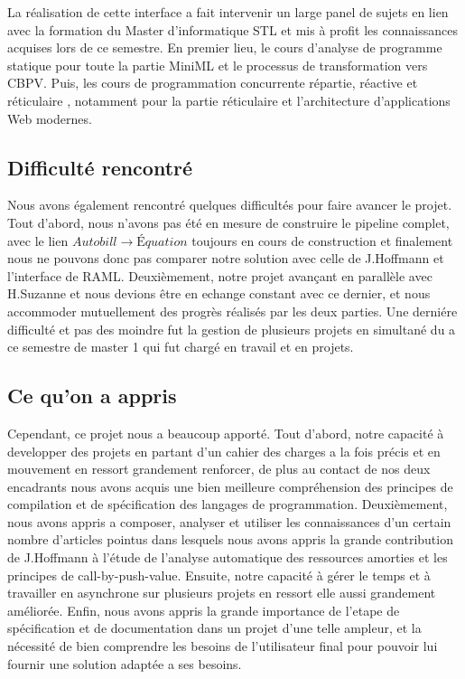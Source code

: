 \documentclass[12pt]{article}
\begin{document}
La réalisation de cette interface a fait intervenir un large panel de
sujets en lien avec la formation du Master d'informatique STL et mis à
profit les connaissances acquises lors de ce semestre. En premier lieu,
le cours d'analyse de programme statique
\cite{APS} pour toute la partie MiniML et le
processus de transformation vers CBPV. Puis, les cours de programmation
concurrente répartie, réactive et réticulaire
\cite{PC3R}, notamment pour la partie
réticulaire et l'architecture d'applications Web modernes.\\

\subsection{Difficulté rencontré}\label{Difficulté-rencontré}

Nous avons également rencontré quelques difficultés pour faire avancer le projet.
Tout d'abord, nous n'avons pas été en mesure de construire le pipeline complet, avec le lien $Autobill \rightarrow Équation$ toujours en cours de construction et finalement nous ne pouvons donc pas comparer notre solution avec celle de J.Hoffmann et l'interface de RAML.
Deuxièmement, notre projet avançant en parallèle avec H.Suzanne et nous devions être en echange constant avec ce dernier, et nous accommoder mutuellement des progrès réalisés par les deux parties.
Une derniére difficulté et pas des moindre fut la gestion de plusieurs projets en simultané du a ce semestre de master 1 qui fut chargé en travail et en projets.

\subsection{Ce qu'on a appris}\label{Ce qu'on a appris}
Cependant, ce projet nous a beaucoup apporté.
Tout d'abord, notre capacité à developper des projets en partant d'un cahier des charges a la fois précis et en mouvement en ressort grandement renforcer, de plus au contact de nos deux encadrants nous avons acquis une bien meilleure compréhension des principes de compilation et de spécification des langages de programmation.
Deuxièmement, nous avons appris a composer, analyser et utiliser les connaissances d'un certain nombre d'articles pointus  dans lesquels nous avons appris la grande contribution de J.Hoffmann à l'étude de l'analyse automatique des ressources amorties et les principes de call-by-push-value.
Ensuite, notre capacité à gérer le temps et à travailler en asynchrone sur plusieurs projets en ressort elle aussi grandement améliorée.
Enfin, nous avons appris la grande importance de l'etape de spécification et de documentation dans un projet d'une telle ampleur, et la nécessité de bien comprendre les besoins de l'utilisateur final pour pouvoir lui fournir une solution adaptée a ses besoins.
\end{document}
